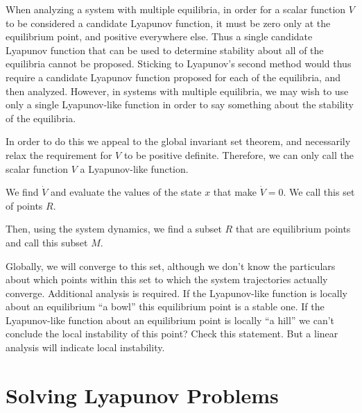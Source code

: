 When analyzing a system with multiple equilibria, in order for a scalar function $V$ to be considered a candidate Lyapunov function, it must be zero only at the equilibrium point, and positive everywhere else.
Thus a single candidate Lyapunov function that can be used to determine stability about all of the equilibria cannot be proposed.
Sticking to Lyapunov's second method would thus require a candidate Lyapunov function proposed for each of the equilibria, and then analyzed.
However, in systems with multiple equilibria, we may wish to use only a single Lyapunov-like function in order to say something about the stability of the equilibria.

In order to do this we appeal to the global invariant set theorem, and necessarily relax the requirement for $V$ to be positive definite.
Therefore, we can only call the scalar function $V$ a Lyapunov-like function.

We find $\dot{V}$ and evaluate the values of the state $x$ that make $\dot{V}=0$.
We call this set of points $R$.

Then, using the system dynamics, we find a subset $R$ that are equilibrium points and call this subset $M$.

Globally, we will converge to this set, although we don't know the particulars about which points within this set to which the system trajectories actually converge.
Additional analysis is required.
If the Lyapunov-like function is locally about an equilibrium ``a bowl'' this equilibrium point is a stable one.
If the Lyapunov-like function about an equilibrium point is locally ``a hill'' we can't conclude the local instability of this point? Check this statement.
But a linear analysis will indicate local instability.

\section{Solving Lyapunov Problems}

